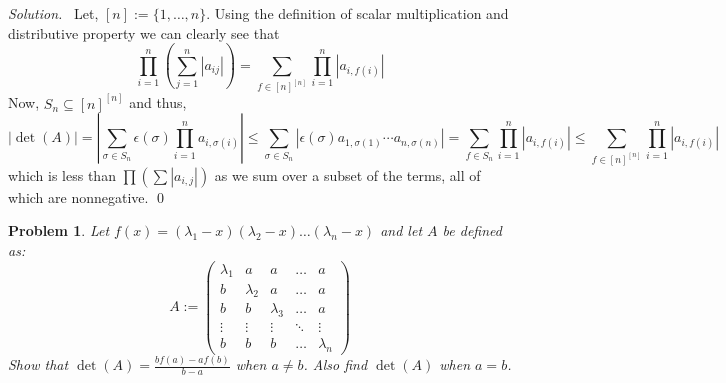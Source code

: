 \documentclass[12pt,a4paper]{article}
\newenvironment{solution}{%
  \par\noindent\textit{Solution.}\ }{\qed}
\theoremstyle{problemstyle}
\newtheorem{problem}{Problem}[section]
\begin{document}
\begin{solution}
    Let, $[n]:=\{1,\ldots,n\}.$
    Using the definition of scalar multiplication and distributive property we can clearly see that
    $$\prod_{i=1}^n\left(\sum_{j=1}^n|a_{ij}|\right)=\sum_{f\in[n]^{[n]}}\prod_{i=1}^n|a_{i,f(i)}|$$
    Now, $S_n\subseteq[n]^{[n]}$ and thus,
    $$|\det(A)|=\left|\sum_{\sigma\in S_n}\epsilon(\sigma)\prod_{i=1}^na_{i,\sigma(i)}\right|\leq\sum_{\sigma\in S_n}|\epsilon(\sigma)a_{1,\sigma(1)}\cdots a_{n,\sigma(n)}|=\sum_{f\in S_n}\prod_{i=1}^n|a_{i,f(i)}|\leq\sum_{f\in[n]^{[n]}}\prod_{i=1}^n|a_{i,f(i)}|$$
    which is less than $\prod(\sum|a_{i,j}|)$ as we sum over a subset of the terms, all of which are nonnegative.
\end{solution}
\begin{problem}\label{prob:1.7}
    Let $f(x) = (\lambda_1 - x)(\lambda_2 - x)\dots(\lambda_n - x)$ and let $A$ be defined as:
    \[
    A := \begin{pmatrix}
    \lambda_1 & a & a & \dots & a \\
    b & \lambda_2 & a & \dots & a \\
    b & b & \lambda_3 & \dots & a \\
    \vdots & \vdots & \vdots & \ddots & \vdots \\
    b & b & b & \dots & \lambda_n
    \end{pmatrix}
    \]
    Show that $\det(A) = \frac{bf(a) - af(b)}{b-a}$ when $a \ne b$. Also find $\det(A)$ when $a=b$.
\end{problem}
\end{document}
